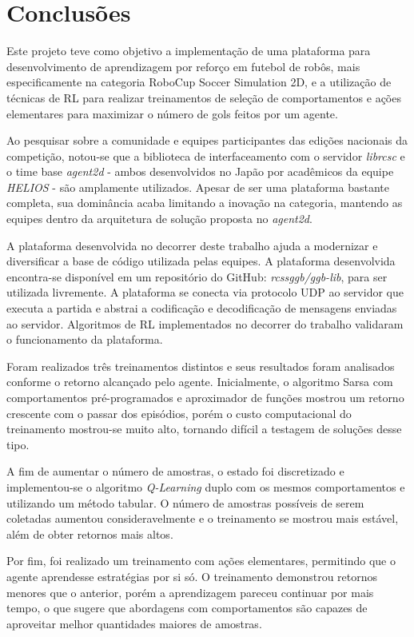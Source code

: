 
\chapter{Conclusões}
\label{chap:Conclusoes}

Este projeto teve como objetivo a implementação de uma plataforma para desenvolvimento de aprendizagem por reforço em futebol de robôs, mais especificamente na categoria RoboCup Soccer Simulation 2D, e a utilização de técnicas de RL para realizar treinamentos de seleção de comportamentos e ações elementares para maximizar o número de gols feitos por um agente.

Ao pesquisar sobre a comunidade e equipes participantes das edições nacionais da competição, notou-se que a biblioteca de interfaceamento com o servidor \textit{librcsc} e o time base \textit{agent2d} - ambos desenvolvidos no Japão por acadêmicos da equipe \textit{HELIOS} - são amplamente utilizados. Apesar de ser uma plataforma bastante completa, sua dominância acaba limitando a inovação na categoria, mantendo as equipes dentro da arquitetura de solução proposta no \textit{agent2d}.

A plataforma desenvolvida no decorrer deste trabalho ajuda a modernizar e diversificar a base de código utilizada pelas equipes. A plataforma desenvolvida encontra-se disponível em um repositório do GitHub: \textit{rcssggb/ggb-lib}, para ser utilizada livremente. A plataforma se conecta via protocolo UDP ao servidor que executa a partida e abstrai a codificação e decodificação de mensagens enviadas ao servidor. Algoritmos de RL implementados no decorrer do trabalho validaram o funcionamento da plataforma.

Foram realizados três treinamentos distintos e seus resultados foram analisados conforme o retorno alcançado pelo agente. Inicialmente, o algoritmo Sarsa com comportamentos pré-programados e aproximador de funções mostrou um retorno crescente com o passar dos episódios, porém o custo computacional do treinamento mostrou-se muito alto, tornando difícil a testagem de soluções desse tipo.

A fim de aumentar o número de amostras, o estado foi discretizado e implementou-se o algoritmo \textit{Q-Learning} duplo com os mesmos comportamentos e utilizando um método tabular. O número de amostras possíveis de serem coletadas aumentou consideravelmente e o treinamento se mostrou mais estável, além de obter retornos mais altos.

Por fim, foi realizado um treinamento com ações elementares, permitindo que o agente aprendesse estratégias por si só. O treinamento demonstrou retornos menores que o anterior, porém a aprendizagem pareceu continuar por mais tempo, o que sugere que abordagens com comportamentos são capazes de aproveitar melhor quantidades maiores de amostras.

